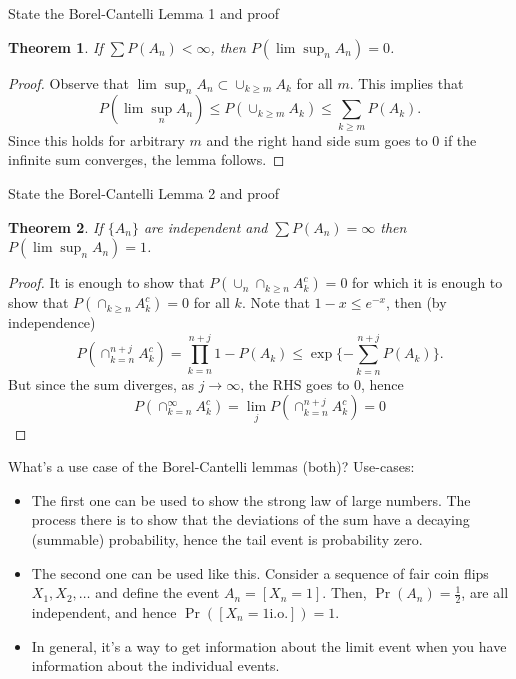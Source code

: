 \documentclass[avery5388,grid,frame]{flashcards}
\newtheorem*{theorem}{Theorem}
\begin{document}
\begin{flashcard}
    {State the Borel-Cantelli Lemma 1 and proof}
    \begin{theorem}
        If $\sum P(A_n) < \infty$, then $P(\lim \sup_n A_n) = 0$.
    \end{theorem}

    \begin{proof}
        Observe that $\lim \sup_n A_n \subset \cup_{k \geq m} A_k$ for all $m$.
        This implies that
        $$P(\lim \sup_n A_n) \leq P(\cup_{k \geq m} A_k) \leq \sum_{k \geq m} P(A_k).$$
        Since this holds for arbitrary $m$ and the right hand side sum goes to $0$ if the infinite sum converges, the lemma follows.
    \end{proof}
\end{flashcard}


\begin{flashcard}
    {State the Borel-Cantelli Lemma 2 and proof}
    \begin{theorem}
        If $\{ A_n \}$ are independent and $\sum P(A_n) = \infty$ then $P(\lim \sup_n A_n) = 1$.
    \end{theorem}

    \begin{proof}
        It is enough to show that $P(\cup_n \cap_{k \geq n} A_k^c) = 0$ for which it is enough to show that $P(\cap_{k \geq n} A_k^c) = 0$ for all $k$. Note that $1 - x \leq e^{-x}$, then (by independence)
        $$P(\cap_{k = n}^{n + j} A_k^c) = \prod_{k = n}^{n+j} 1 - P(A_k) \leq \exp \{ - \sum_{k = n}^{n + j} P(A_k) \}.$$
        But since the sum diverges, as $j \rightarrow \infty$, the RHS goes to 0, hence
        $$P( \cap_{k=n}^\infty A_k^c ) = \lim_j P(\cap_{k=n}^{n+j} A_k^c) = 0$$
    \end{proof}
\end{flashcard}


\begin{flashcard}
    {What's a use case of the Borel-Cantelli lemmas (both)?}
    Use-cases:
    \begin{itemize}
        \item The first one can be used to show the strong law of large numbers. The process there is to show that the deviations of the sum have a decaying (summable) probability, hence the tail event is probability zero.
        \item The second one can be used like this. Consider a sequence of fair coin flips $X_1, X_2, \dots$ and define the event $A_n = [X_n = 1]$. Then, $\Pr(A_n) = \frac 1 2$, are all independent, and hence $\Pr( [X_n = 1 \text{i.o.}] ) = 1$.
        \item In general, it's a way to get information about the limit event when you have information about the individual events.
    \end{itemize}
\end{flashcard}
\end{document}
